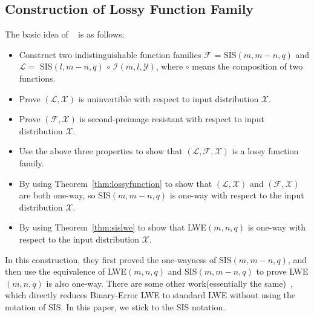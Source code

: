 \documentclass[a4paper]{article}
\theoremstyle{definition}
\theoremstyle{remark}
\begin{document}
\subsection{Construction of Lossy Function Family}
The basic idea of ~\cite{micciancio2013hardness} is as follows:
\begin{itemize}
  \item Construct two indistinguishable function families $\mathcal{F}$ = SIS$(m, m - n, q)$ and 
  $\mathcal{L} = $ SIS$(l, m - n, q)$ $\circ$ $\mathcal{I}(m, l, \mathcal{Y})$, where $\circ$ means
  the composition of two functions.
  \item Prove $(\mathcal{L}, \mathcal{X})$ is uninvertible with respect to input distribution $\mathcal{X}$.
  \item Prove $(\mathcal{F}, \mathcal{X})$ is second-preimage resistant with respect to input distribution $\mathcal{X}$.
  \item Use the above three properties to show that $(\mathcal{L},\mathcal{F}, \mathcal{X})$ is a lossy function family.
  \item By using Theorem~\ref{thm:lossyfunction} to show that $(\mathcal{L}, \mathcal{X})$ and $(\mathcal{F}, \mathcal{X})$ 
  are both one-way, so SIS$(m, m - n, q)$ is one-way with respect to the input distribution $\mathcal{X}$.
  \item By using Theorem~\ref{thm:sislwe} to show that LWE$(m, n, q)$ is one-way with respect to the input distribution $\mathcal{X}$.
\end{itemize}
In this construction, they first proved the one-wayness of SIS$(m, m - n, q)$, and then use the equivalence of LWE$(m, n, q)$ 
and SIS$(m, m - n, q)$ to prove LWE$(m, n, q)$ is also one-way. There are some other work(essentially the same)~\cite{dottling2013lossy}, which directly reduces Binary-Error LWE to standard LWE without using the notation of SIS.
In this paper, we stick to the SIS notation.
\end{document}
